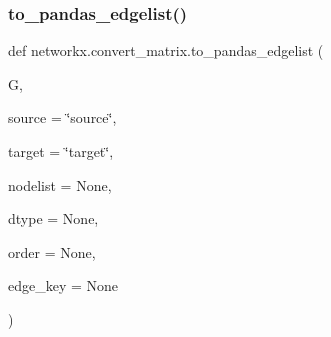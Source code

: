  \mbox{\label{namespacenetworkx_1_1convert__matrix_a6f3984434d922d8f5ee4fc1aff940004}} 
\subsubsection{\texorpdfstring{to\+\_\+pandas\+\_\+edgelist()}{to\_pandas\_edgelist()}}
{\footnotesize\ttfamily def networkx.\+convert\+\_\+matrix.\+to\+\_\+pandas\+\_\+edgelist (\begin{DoxyParamCaption}\item[{}]{G,  }\item[{}]{source = {\ttfamily \char`\"{}source\char`\"{}},  }\item[{}]{target = {\ttfamily \char`\"{}target\char`\"{}},  }\item[{}]{nodelist = {\ttfamily None},  }\item[{}]{dtype = {\ttfamily None},  }\item[{}]{order = {\ttfamily None},  }\item[{}]{edge\+\_\+key = {\ttfamily None} }\end{DoxyParamCaption})}

